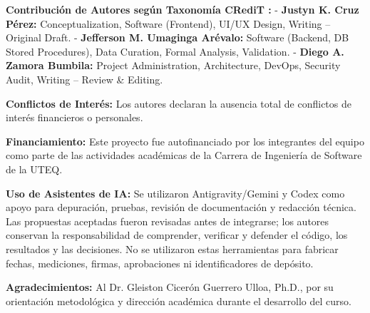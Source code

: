 \documentclass[11pt,a4paper]{report}
\begin{document}
\textbf{Contribución de Autores según Taxonomía CRediT \cite{niso2022credit}:}
- \textbf{Justyn K. Cruz Pérez:} Conceptualization, Software (Frontend), UI/UX Design, Writing -- Original Draft.
- \textbf{Jefferson M. Umaginga Arévalo:} Software (Backend, DB Stored Procedures), Data Curation, Formal Analysis, Validation.
- \textbf{Diego A. Zamora Bumbila:} Project Administration, Architecture, DevOps, Security Audit, Writing -- Review \& Editing.

\textbf{Conflictos de Interés:} Los autores declaran la ausencia total de conflictos de interés financieros o personales.

\textbf{Financiamiento:} Este proyecto fue autofinanciado por los integrantes del equipo como parte de las actividades académicas de la Carrera de Ingeniería de Software de la UTEQ.

\textbf{Uso de Asistentes de IA:} Se utilizaron Antigravity/Gemini y Codex como apoyo para depuración, pruebas, revisión de documentación y redacción técnica. Las propuestas aceptadas fueron revisadas antes de integrarse; los autores conservan la responsabilidad de comprender, verificar y defender el código, los resultados y las decisiones. No se utilizaron estas herramientas para fabricar fechas, mediciones, firmas, aprobaciones ni identificadores de depósito.

\textbf{Agradecimientos:} Al Dr. Gleiston Cicerón Guerrero Ulloa, Ph.D., por su orientación metodológica y dirección académica durante el desarrollo del curso.




\appendix
\end{document}
